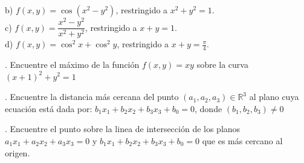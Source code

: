 \documentclass[letterpaper]{article}
\renewcommand{\*}{\cdot}
\theoremstyle{definition}
\begin{document}
b) $f(x,y) = \cos{(x^2 - y^2)}{}$, restringido a $x^2 + y^2 =1$.\\

c) $f(x,y) = \dfrac{x^2 - y^2}{x^2 + y^2}$, restringido a $x + y =1$.\\

d) $f(x,y) = \cos^2{x} +\cos^2{y}$, restringido a $x + y =\frac{\pi}{4}$.


. Encuentre el máximo de la función $f(x,y) = xy$ sobre la curva $(x +1)^2 + y^2 =1$

. Encuentre la distancia más cercana del punto $(a_1, a_2, a_3) \in \mathbb{R}^3$ al plano cuya ecuación está dada por: $b_1x_1 + b_2x_2 + b_3x_3 + b_0 = 0$, donde $(b_1, b_2, b_3) \neq 0 $

. Encuentre el punto sobre la linea de intersección de los planos  $a_1x_1 + a_2x_2 + a_3x_3 = 0$ y $b_1x_1 + b_2x_2 + b_3x_3 + b_0 = 0$ que es más cercano al origen.
\end{document}
